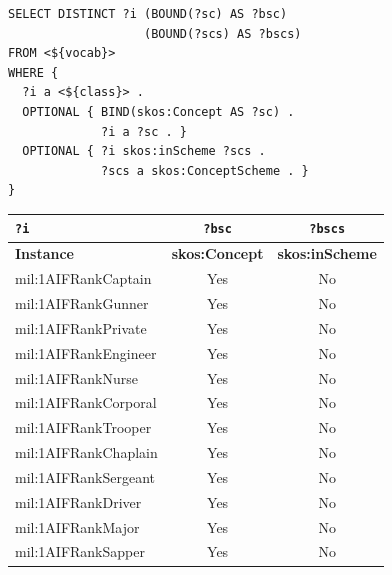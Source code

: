 \begin{lstlisting}[captionpos=b, caption=Q3 -- Query to get a list of candidate code list members and whether they are tagged with \textit{skos:Concept} and \textit{skos:inScheme},label=lst:sparql3,basicstyle=\small\ttfamily,frame=single]
SELECT DISTINCT ?i (BOUND(?sc) AS ?bsc)
                   (BOUND(?scs) AS ?bscs)
FROM <${vocab}>
WHERE {
  ?i a <${class}> .
  OPTIONAL { BIND(skos:Concept AS ?sc) .
             ?i a ?sc . }
  OPTIONAL { ?i skos:inScheme ?scs .
             ?scs a skos:ConceptScheme . }
}
\end{lstlisting}

\begin{table}[h]
\footnotesize
\centering
\begin{tabular}{|l|c|c|}
\hline
\textbf{\texttt{?i}}      & \textbf{\texttt{?bsc}} & \textbf{\texttt{?bscs}}      \\ \hline \hline
\textbf{Instance}         & \textbf{skos:Concept}  & \textbf{skos:inScheme}       \\ \hline
mil:1AIFRankCaptain       & Yes                    & No                           \\ \hline
mil:1AIFRankGunner        & Yes                    & No                           \\ \hline
mil:1AIFRankPrivate       & Yes                    & No                           \\ \hline
mil:1AIFRankEngineer      & Yes                    & No                           \\ \hline
mil:1AIFRankNurse         & Yes                    & No                           \\ \hline
mil:1AIFRankCorporal      & Yes                    & No                           \\ \hline
mil:1AIFRankTrooper       & Yes                    & No                           \\ \hline
mil:1AIFRankChaplain      & Yes                    & No                           \\ \hline
mil:1AIFRankSergeant      & Yes                    & No                           \\ \hline
mil:1AIFRankDriver        & Yes                    & No                           \\ \hline
mil:1AIFRankMajor         & Yes                    & No                           \\ \hline
mil:1AIFRankSapper        & Yes                    & No                           \\ \hline

\end{tabular}
\end{table}
